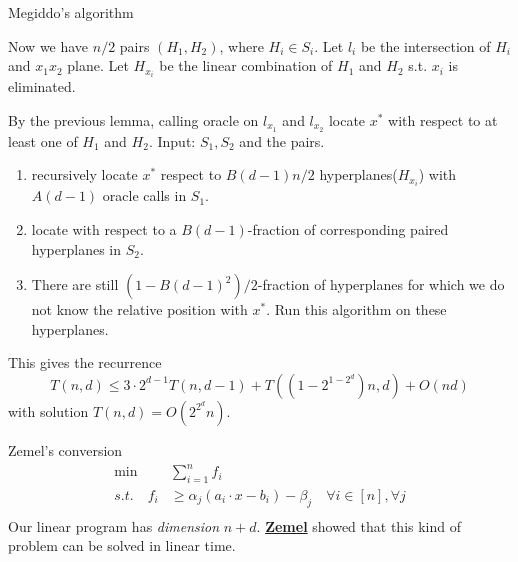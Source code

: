 \documentclass{beamer}
\begin{document}
\begin{frame}[allowframebreaks]{Megiddo's algorithm}
\begin{minipage}[t]{.5\textwidth}
\begin{figure}
    \end{figure}
    \end{minipage}%
    \begin{minipage}[t]{.5\textwidth} 
        \vspace{25pt}
        Now we have $n/2$ pairs $(H_1,H_2)$, where $H_i\in S_i$. Let $l_i$ be the intersection of $H_i$ and $x_1x_2$ plane.
        Let $H_{x_i}$ be the linear combination of $H_1$ and $H_2$ s.t. $x_i$ is eliminated.
    \end{minipage}

    { 
    By the previous lemma, calling oracle on $l_{x_1}$ and $l_{x_2}$ locate $x^*$ with respect to at least one of $H_1$ and $H_2$.}
    \newpage
    Input: $S_1,S_2$ and the pairs.
    \begin{enumerate}
        \item recursively locate $x^*$ respect to $B(d-1)n/2$ hyperplanes($H_{x_i}$) with $A(d-1)$ oracle calls in $S_1$.
        \item locate with respect to a $B(d-1)$-fraction of corresponding paired hyperplanes in $S_2$.
        \item There are still $(1-{B(d-1)}^2)/2$-fraction of hyperplanes for which we do not know the relative position with $x^*$. Run this algorithm on these hyperplanes.
    \end{enumerate}
    This gives the recurrence
    \[
        T(n,d)\leq 3\cdot 2^{d-1}T(n,d-1)+T((1-2^{1-2^d})n,d)+O(nd)
    \]
    with solution $T(n,d)=O(2^{2^d}n)$.
\end{frame}
\begin{frame}{Zemel's conversion}
    \begin{align*}
        \min &\sum_{i=1}^n f_i\\
        s.t. \quad f_i&\geq \alpha_j(a_i\cdot x -b_i)-\beta_j \quad \forall i\in[n], \forall j\\
    \end{align*}
    Our linear program has \emph{dimension} $n+d$. 
    \textbf{\href{https://www.sciencedirect.com/science/article/abs/pii/0020019084900140}{Zemel}} showed that this kind of problem can be solved in linear time.
\end{frame}
\end{document}
